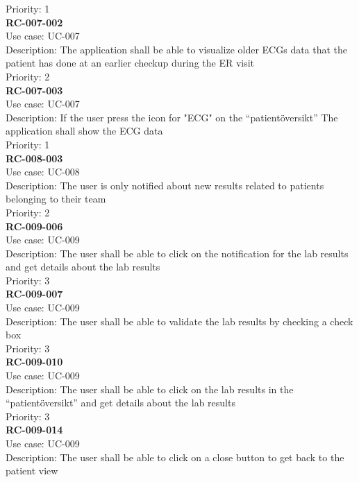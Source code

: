 Priority: 1 \\
\newline
\textbf{RC-007-002} \\
Use case: UC-007 \\
Description: The application shall be able to visualize older ECGs data that the patient has done at an earlier checkup during the ER visit\\
Priority: 2 \\
\newline
\textbf{RC-007-003} \\
Use case: UC-007 \\
Description: If the user press the icon for "ECG" on the “patientöversikt” The application shall show the ECG data \\
Priority: 1 \\
\newline
\textbf{RC-008-003} \\
Use case: UC-008 \\
Description: The user is only notified about new results related to patients belonging to their team \\
Priority: 2 \\
\newline
\textbf{RC-009-006} \\
Use case: UC-009 \\
Description: The user shall be able to click on the notification for the lab results and get details about the lab results\\
Priority: 3 \\
\newline
\textbf{RC-009-007} \\
Use case: UC-009 \\
Description: The user shall be able to validate the lab results by checking a check box \\
Priority: 3 \\
\newline
\textbf{RC-009-010} \\
Use case: UC-009 \\
Description: The user shall be able to click on the lab results in the “patientöversikt” and get details about the lab results \\
Priority: 3 \\
\newline
\textbf{RC-009-014} \\
Use case: UC-009 \\
Description: The user shall be able to click on a close button to get back to the patient view \\
